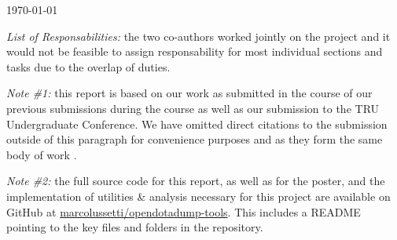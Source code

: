 \begin{titlepage}
	
	
	\vfill\vfill\vfill %
	
	{\large\today} %
	
	
	 
	
	\vfill %
	
\end{titlepage}


\addtocounter{page}{1} %

\begin{mdframed}[linewidth=2pt]

	\emph{List of Responsabilities:} the two co-authors worked jointly on the project and it would not be feasible to assign responsability for most individual sections and tasks due to the overlap of duties.

	\emph{Note \#1:} this report is based on our work as submitted in the course of our previous submissions during the course as well as our submission to the TRU Undergraduate Conference. We have omitted direct citations to the submission outside of this paragraph for convenience purposes and as they form the same body of work \cite{lussettiBigDataReduction2019}.
	
	\emph{Note \#2:} the full source code for this report, as well as for the poster, and the implementation of utilities \& analysis necessary for this project are available on GitHub at \href{https://github.com/marcolussetti/opendotadump-tools}{marcolussetti/opendotadump-tools}. This includes a README pointing to the key files and folders in the repository.
\end{mdframed}

